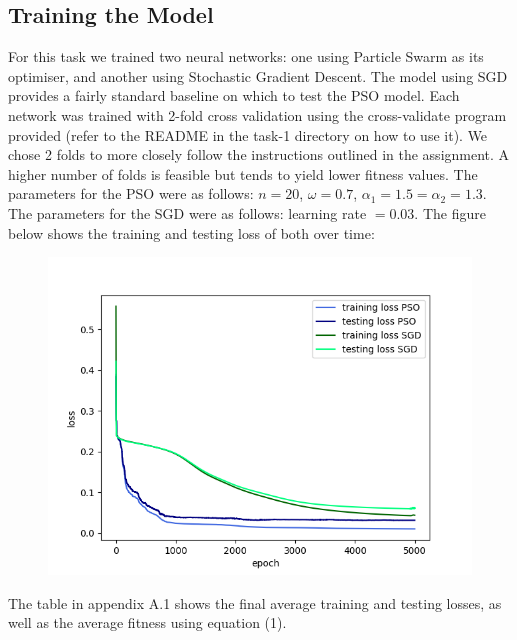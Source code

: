 \documentclass[12pt]{article}
\begin{document}
\subsection{Training the Model}
For this task we trained two neural networks: one using Particle Swarm as its optimiser, and another using Stochastic Gradient Descent.
The model using SGD provides a fairly standard baseline on which to test the PSO model. 
Each network was trained with 2-fold cross validation using the cross-validate program provided (refer to the README in the task-1 directory on how to use it). 
We chose 2 folds to more closely follow the instructions outlined in the assignment. A higher number of folds is feasible but tends to yield lower fitness values.
The parameters for the PSO were as follows: $n=20$, $\omega=0.7$, $\alpha_1 = 1.5 = \alpha_2 = 1.3$. 
The parameters for the SGD were as follows: learning rate $=0.03$.
The figure below shows the training and testing loss of both over time:

\begin{figure}[h]                   
      \begin{center}                  
          \includegraphics[scale=0.45]{figures/nonlinear.png}    
      \end{center}                                                                             
\end{figure}
The table in appendix A.1 shows the final average training and testing losses, as well as the average fitness using equation (1).
\end{document}

